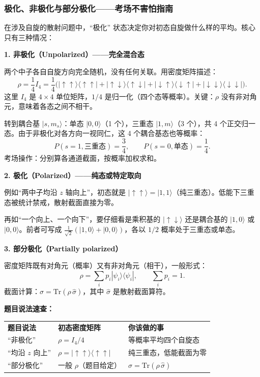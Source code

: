 \begin{derivationbox}
\subsubsection*{极化、非极化与部分极化——考场不害怕指南}

在涉及自旋的散射问题中，``极化'' 状态决定你对初态自旋做什么样的平均。核心只有三种情况：

\textbf{1. 非极化（Unpolarized）——完全混合态}

两个中子各自自旋方向完全随机，没有任何关联。用密度矩阵描述：
\[
\rho = \frac{1}{4} I_4 = \frac{1}{4}\bigl( |{\uparrow\uparrow}\rangle\langle{\uparrow\uparrow}| + |{\uparrow\downarrow}\rangle\langle{\uparrow\downarrow}| + |{\downarrow\uparrow}\rangle\langle{\downarrow\uparrow}| + |{\downarrow\downarrow}\rangle\langle{\downarrow\downarrow}| \bigr).
\]
这里 $I_4$ 是 $4 \times 4$ 单位矩阵，$1/4$ 是归一化（四个态等概率）。关键：$\rho$ 没有非对角元，意味着各态之间不相干。

转到耦合基 $|s, m_s\rangle$：单态 $|0, 0\rangle$（1 个），三重态 $|1, m\rangle$（3 个），共 4 个正交归一态。由于非极化对各方向一视同仁，这 4 个耦合基态也等概率：
\[
P(s = 1, \text{三重态}) = \frac{3}{4}, \qquad P(s = 0, \text{单态}) = \frac{1}{4}.
\]
考场操作：分别算各通道截面，按概率加权求和。

\textbf{2. 极化（Polarized）——纯态或特定取向}

例如``两中子均沿 $z$ 轴向上''，初态就是 $|{\uparrow\uparrow}\rangle = |1, 1\rangle$（纯三重态）。低能下三重态被统计禁戒，散射截面直接为零。

再如``一个向上、一个向下''，要仔细看是乘积基的 $|{\uparrow\downarrow}\rangle$ 还是耦合基的 $|1, 0\rangle$ 或 $|0, 0\rangle$。前者可写成 $\frac{1}{\sqrt{2}}(|1, 0\rangle + |0, 0\rangle)$，各以 $1/2$ 概率处于三重态或单态。

\textbf{3. 部分极化（Partially polarized）}

密度矩阵既有对角元（概率）又有非对角元（相干），一般形式：
\[
\rho = \sum_i p_i |\psi_i\rangle\langle\psi_i|, \qquad \sum_i p_i = 1.
\]
截面计算：$\sigma = \text{Tr}(\rho\, \hat{\sigma})$，其中 $\hat{\sigma}$ 是散射截面算符。

\textbf{题目说法速查：}

\begin{tabular}{lll}
\textbf{题目说法} & \textbf{初态密度矩阵} & \textbf{你该做的事} \\
``非极化'' & $\rho = I_4/4$ & 等概率平均四个自旋态 \\
``均沿 $z$ 向上'' & $\rho = |{\uparrow\uparrow}\rangle\langle{\uparrow\uparrow}|$ & 纯三重态，低能截面为零 \\
``部分极化'' & 一般 $\rho$（题目给定） & $\sigma = \text{Tr}(\rho\, \hat{\sigma})$ \\
\end{tabular}


\end{derivationbox}
